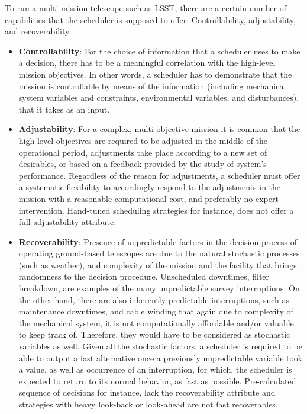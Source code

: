 \documentclass[12pt]{article}
\theoremstyle{definition}
\begin{document}
To run a multi-mission telescope such as LSST, there are a certain number of capabilities that the scheduler is supposed to offer: Controllability, adjustability, and recoverability.
\begin{itemize}
\item \textbf{Controllability}: For the choice of information that a scheduler uses to make a decision, there has to be a meaningful correlation with the high-level mission objectives. In other words, a scheduler has to demonstrate that the mission is controllable by means of the information (including mechanical system variables and constraints, environmental variables, and disturbances), that it takes as an input.

\item \textbf{Adjustability}: For a complex, multi-objective mission it is common that the high level objectives are required to be adjusted in the middle of the operational period, adjustments take place according to a new set of desirables, or based on a feedback provided by the study of system's performance. Regardless of the reason for adjustments, a scheduler must offer a systematic flexibility to accordingly respond to the adjustments in the mission with a reasonable computational cost, and preferably no expert intervention. Hand-tuned scheduling strategies for instance, does not offer a full adjustability attribute.

\item \textbf{Recoverability}: Presence of unpredictable factors in the decision process of operating ground-based telescopes are due to the natural stochastic processes (such as weather), and complexity of the mission and the facility that brings randomness to the decision procedure. Unscheduled downtimes, filter breakdown, are examples of the many unpredictable survey interruptions. On the other hand, there are also inherently predictable interruptions, such as maintenance downtimes, and cable winding that again due to complexity of the mechanical system, it is not computationally affordable and/or valuable to keep track of. Therefore, they would have to be considered as stochastic variables as well. Given all the stochastic factors, a scheduler is required to be able to output a fast alternative once a previously unpredictable variable took a value, as well as occurrence of an interruption, for which, the scheduler is expected to return to its normal behavior, as fast as possible. Pre-calculated sequence of decisions for instance, lack the recoverability attribute and strategies with heavy look-back or look-ahead are not fast recoverables. 
\end{itemize}
\end{document}
